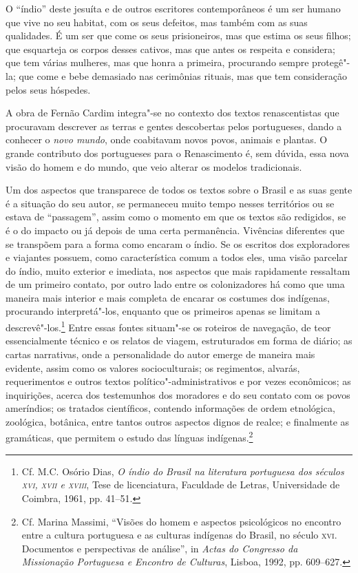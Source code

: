 O ``índio'' deste jesuíta e de outros escritores contemporâneos é um
ser humano que vive no seu habitat, com os seus defeitos, mas também
com as suas qualidades. É um ser que come os seus prisioneiros, mas que
estima os seus filhos; que esquarteja os corpos desses cativos, mas que
antes os respeita e considera; que tem várias mulheres, mas que honra a
primeira, procurando sempre protegê"-la; que come e bebe demasiado nas
cerimônias rituais, mas que tem consideração pelos seus hóspedes.

A obra de Fernão Cardim integra"-se no contexto dos textos
renascentistas que procuravam descrever as terras e gentes descobertas
pelos portugueses, dando a conhecer o \textit{novo mundo}, onde
coabitavam novos povos, animais e plantas. O grande contributo dos
portugueses para o Renascimento é, sem dúvida, essa nova visão do homem
e do mundo, que veio alterar os modelos tradicionais.

Um dos aspectos que transparece de todos os textos sobre o Brasil e
as suas gente é a situação do seu autor, se permaneceu muito tempo
nesses territórios ou se estava de ``passagem'', assim como o momento em
que os textos são redigidos, se é o do impacto ou já depois de uma
certa permanência. Vivências diferentes que se transpõem para a forma
como encaram o índio. Se os escritos dos exploradores e viajantes
possuem, como característica comum a todos eles, uma visão parcelar do
índio, muito exterior e imediata, nos aspectos que mais rapidamente
ressaltam de um primeiro contato, por outro lado entre os
colonizadores há como que uma maneira mais interior e mais completa de
encarar os costumes dos indígenas, procurando interpretá"-los, enquanto
que os primeiros apenas se limitam a descrevê"-los.\footnote{ Cf.
M.C. Osório Dias, \textit{O índio do Brasil na literatura portuguesa
dos séculos \textsc{xvi}, \textsc{xvii} e \textsc{xviii}}, Tese de licenciatura, Faculdade de
Letras, Universidade de Coimbra, 1961, pp. 41--51.} Entre
essas fontes situam"-se os roteiros de navegação, de teor essencialmente
técnico e os relatos de viagem, estruturados em forma de diário; as
cartas narrativas, onde a personalidade do autor emerge de maneira mais
evidente, assim como os valores socioculturais; os regimentos, alvarás,
requerimentos e outros textos político"-administrativos e por vezes
econômicos; as inquirições, acerca dos testemunhos dos moradores e do
seu contato com os povos ameríndios; os tratados científicos, contendo
informações de ordem etnológica, zoológica, botânica, entre tantos
outros aspectos dignos de realce; e finalmente as gramáticas, que
permitem o estudo das línguas indígenas.\footnote{ Cf. Marina
Massimi, ``Visões do homem e aspectos psicológicos no encontro entre a
cultura portuguesa e as culturas indígenas do Brasil, no século \textsc{xvi}.
Documentos e perspectivas de análise'', in \textit{Actas do Congresso da
Missionação Portuguesa e Encontro de Culturas}, Lisboa, 1992, pp. 609--627.}

